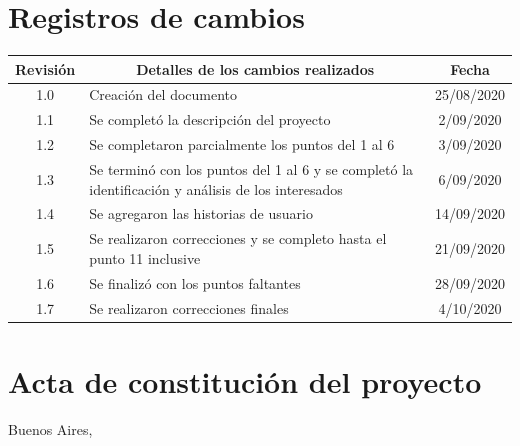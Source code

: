 \documentclass[11pt]{charter}
\begin{document}
\maketitle
\thispagestyle{empty}
\pagebreak


\thispagestyle{empty}
{\setlength{\parskip}{0pt}
\tableofcontents{}
}
\pagebreak


\section{Registros de cambios}
\label{sec:registro}


\begin{table}[ht]
\label{tab:registro}
\centering
\begin{tabularx}{\linewidth}{@{}|c|X|c|@{}}
\hline
\rowcolor[HTML]{C0C0C0} 
Revisión & \multicolumn{1}{c|}{\cellcolor[HTML]{C0C0C0}Detalles de los cambios realizados} & Fecha      \\ \hline
1.0      & Creación del documento                                          & 25/08/2020 \\ \hline
1.1      & Se completó la descripción del proyecto & 2/09/2020 \\ \hline
1.2      & Se completaron parcialmente los puntos del 1 al 6 & 3/09/2020 \\ \hline
1.3		& Se terminó con los puntos del 1 al 6 y se completó la identificación y análisis de los interesados & 6/09/2020 \\ \hline
1.4     & Se agregaron las historias de usuario & 14/09/2020 \\ \hline
1.5		& Se realizaron correcciones y se completo hasta el punto 11 inclusive & 21/09/2020 \\ \hline
1.6     & Se finalizó con los puntos faltantes & 28/09/2020 \\ \hline
1.7     & Se realizaron correcciones finales & 4/10/2020 \\ \hline
\end{tabularx}
\end{table}

\pagebreak



\section{Acta de constitución del proyecto}
\label{sec:acta}

\begin{flushright}
Buenos Aires, \fechaInicioName
\end{flushright}
\end{document}
